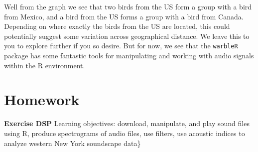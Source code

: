 \documentclass[]{krantz}
\begin{document}
Well from the graph we see that two birds from the US form a group with a bird from Mexico, and a bird from the US forms a group with a bird from Canada. Depending on where exactly the birds from the US are located, this could potentially suggest some variation across geographical distance. We leave this to you to explore further if you so desire. But for now, we see that the \texttt{warbleR} package has some fantastic tools for manipulating and working with audio signals within the R environment.

\hypertarget{homework-10}{%
\section{Homework}\label{homework-10}}

\textbf{Exercise DSP} Learning objectives: download, manipulate, and play sound files using R, produce spectrograms of audio files, use filters, use acoustic indices to analyze western New York soundscape data\}



\backmatter
\printindex
\end{document}
